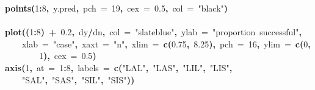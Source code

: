 \documentclass{article}
\makeatletter
\newcommand{\hlnumber}[1]{\textcolor[rgb]{0,0,0}{#1}}%
\newcommand{\hlfunctioncall}[1]{\textcolor[rgb]{.5,0,.33}{\textbf{#1}}}%
\newcommand{\hlstring}[1]{\textcolor[rgb]{.6,.6,1}{#1}}%
\newcommand{\hlkeyword}[1]{\textbf{#1}}%
\newcommand{\hlargument}[1]{\textcolor[rgb]{.69,.25,.02}{#1}}%
\newcommand{\hlsymbol}[1]{#1}%
\newcommand{\hlstd}[1]{\textcolor[rgb]{0,0,0}{#1}}%
\newenvironment{kframe}{%
 \def\FrameCommand##1{\hskip\@totalleftmargin \hskip-\fboxsep
 \colorbox{shadecolor}{##1}\hskip-\fboxsep
     \hskip-\linewidth \hskip-\@totalleftmargin \hskip\columnwidth}%
 \MakeFramed {\advance\hsize-\width
   \@totalleftmargin\z@ \linewidth\hsize
   \@setminipage}}%
 {\par\unskip\endMakeFramed}
\newenvironment{knitrout}{}{} %
\makeatother
\begin{document}
\begin{knitrout}
{\begin{kframe}
\begin{flushleft}
\hlstd{}\hlfunctioncall{points}\hlkeyword{(}\hlnumber{1}\hlkeyword{:}\hlnumber{8}\hlkeyword{,}{\ }\hlsymbol{y.pred}\hlkeyword{,}{\ }\hlargument{pch}{\ }\hlargument{=}{\ }\hlnumber{19}\hlkeyword{,}{\ }\hlargument{cex}{\ }\hlargument{=}{\ }\hlnumber{0.5}\hlkeyword{,}{\ }\hlargument{col}{\ }\hlargument{=}{\ }\hlstring{"black"}\hlkeyword{)}\hspace*{\fill}\\
\hlstd{}\hspace*{\fill}\\
\hlstd{}\hlfunctioncall{plot}\hlkeyword{(}\hlkeyword{(}\hlnumber{1}\hlkeyword{:}\hlnumber{8}\hlkeyword{)}{\ }\hlkeyword{+}{\ }\hlnumber{0.2}\hlkeyword{,}{\ }\hlsymbol{d}\hlkeyword{\usebox{\hlnormalsizeboxdollar}}\hlsymbol{y}\hlkeyword{/}\hlsymbol{d}\hlkeyword{\usebox{\hlnormalsizeboxdollar}}\hlsymbol{n}\hlkeyword{,}{\ }\hlargument{col}{\ }\hlargument{=}{\ }\hlstring{"slateblue"}\hlkeyword{,}{\ }\hlargument{ylab}{\ }\hlargument{=}{\ }\hlstring{"proportion{\ }successful"}\hlkeyword{,}\hspace*{\fill}\\
\hlstd{}{\ }{\ }{\ }{\ }\hlargument{xlab}{\ }\hlargument{=}{\ }\hlstring{"case"}\hlkeyword{,}{\ }\hlargument{xaxt}{\ }\hlargument{=}{\ }\hlstring{"n"}\hlkeyword{,}{\ }\hlargument{xlim}{\ }\hlargument{=}{\ }\hlfunctioncall{c}\hlkeyword{(}\hlnumber{0.75}\hlkeyword{,}{\ }\hlnumber{8.25}\hlkeyword{)}\hlkeyword{,}{\ }\hlargument{pch}{\ }\hlargument{=}{\ }\hlnumber{16}\hlkeyword{,}{\ }\hlargument{ylim}{\ }\hlargument{=}{\ }\hlfunctioncall{c}\hlkeyword{(}\hlnumber{0}\hlkeyword{,}\hspace*{\fill}\\
\hlstd{}{\ }{\ }{\ }{\ }{\ }{\ }{\ }{\ }\hlnumber{1}\hlkeyword{)}\hlkeyword{,}{\ }\hlargument{cex}{\ }\hlargument{=}{\ }\hlnumber{0.5}\hlkeyword{)}\hspace*{\fill}\\
\hlstd{}\hlfunctioncall{axis}\hlkeyword{(}\hlnumber{1}\hlkeyword{,}{\ }\hlargument{at}{\ }\hlargument{=}{\ }\hlnumber{1}\hlkeyword{:}\hlnumber{8}\hlkeyword{,}{\ }\hlargument{labels}{\ }\hlargument{=}{\ }\hlfunctioncall{c}\hlkeyword{(}\hlstring{"LAL"}\hlkeyword{,}{\ }\hlstring{"LAS"}\hlkeyword{,}{\ }\hlstring{"LIL"}\hlkeyword{,}{\ }\hlstring{"LIS"}\hlkeyword{,}\hspace*{\fill}\\
\hlstd{}{\ }{\ }{\ }{\ }\hlstring{"SAL"}\hlkeyword{,}{\ }\hlstring{"SAS"}\hlkeyword{,}{\ }\hlstring{"SIL"}\hlkeyword{,}{\ }\hlstring{"SIS"}\hlkeyword{)}\hlkeyword{)}\hspace*{\fill}\\

\end{flushleft}
\end{kframe}}
\end{knitrout}
\end{document}
